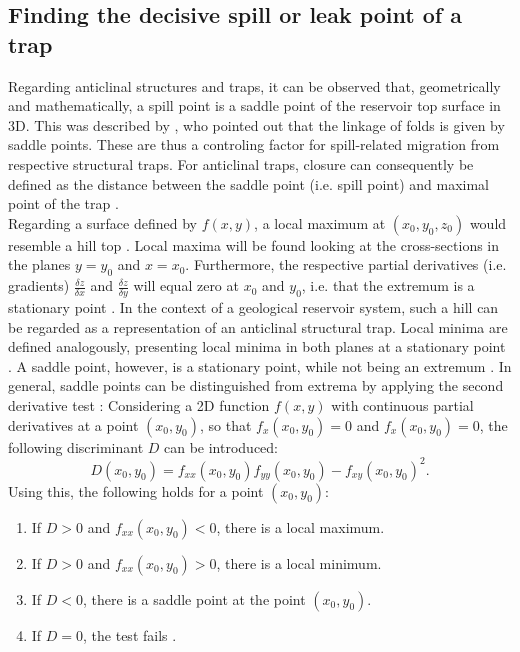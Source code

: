 			\subsection{Finding the decisive spill or leak point of a trap} %
			Regarding anticlinal structures and traps, it can be observed that, geometrically and mathematically, a spill point is a saddle point of the reservoir top surface in 3D. This was described by \citet{collignon2015fold_linkage}, who pointed out that the linkage of folds is given by saddle points. These are thus a controling factor for spill-related migration from respective structural traps. For anticlinal traps, closure can consequently be defined as the distance between the saddle point (i.e. spill point) and maximal point of the trap \citep{collignon2015fold_linkage}.\\
			Regarding a surface defined by $f(x,y)$, a local maximum at $(x_0,y_0,z_0)$ would resemble a hill top \citep{guichard2013calculus}. Local maxima will be found looking at the cross-sections in the planes $y = y_0$ and $x = x_0$. Furthermore, the respective partial derivatives (i.e. gradients) $\frac{\delta z}{\delta x}$ and $\frac{\delta z}{\delta y}$ will equal zero at $x_0$ and $y_0$, i.e. that the extremum is a stationary point \citep{guichard2013calculus, weisstein2017saddlepoint}. In the context of a geological reservoir system, such a hill can be regarded as a representation of an anticlinal structural trap. Local minima are defined analogously, presenting local minima in both planes at a stationary point \citep{guichard2013calculus}. A saddle point, however, is a stationary point, while not being an extremum \citep{weisstein2017saddlepoint}. In general, saddle points can be distinguished from extrema by applying the second derivative test \citep{guichard2013calculus, weisstein2017saddlepoint}: Considering a 2D function $f(x,y)$ with continuous partial derivatives at a  point $(x_0,y_0)$, so that $f_x(x_0,y_0) = 0$ and $f_x(x_0,y_0) = 0$, the following discriminant $D$ can be introduced:
			\begin{equation}\label{eq:discriminant_D}
			D(x_0,y_0) = f_{xx}(x_0,y_0)f_{yy}(x_0,y_0) - f_{xy}(x_0,y_0)^2.
			\end{equation}
			Using this, the following holds for a point $(x_0,y_0)$:
			\begin{enumerate}
				\item If $D > 0$ and $f_{xx}(x_0,y_0) < 0$, there is a local maximum.
				\item If $D > 0$ and $f_{xx}(x_0,y_0) > 0$, there is a local minimum.
				\item If $D < 0$, there is a saddle point at the point $(x_0,y_0)$.
				\item If $D = 0$, the test fails \citep{guichard2013calculus}.
			\end{enumerate}
